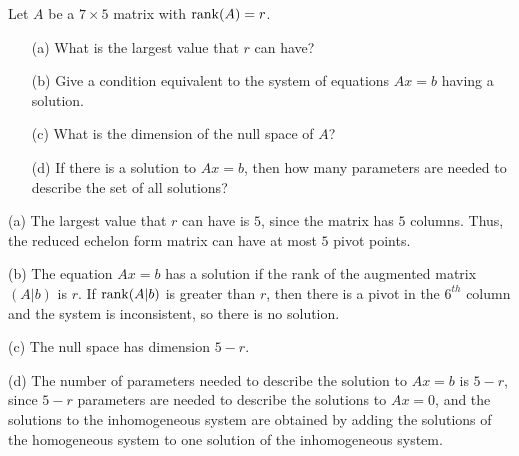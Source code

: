 \documentclass{ximera}
\begin{document}
\begin{exercise} \label{c5.6.1}
Let $A$ be a $7\times 5$ matrix with ${\rm rank}(A)=r$.
\begin{itemize}
\item[(a)]	What is the largest value that $r$ can have?
\item[(b)]	Give a condition equivalent to the system of
	equations $Ax=b$ having a solution.
\item[(c)]	What is the dimension of the null space of $A$?
\item[(d)]	If there is a solution to $Ax=b$, then how many
parameters are needed to describe the set of all solutions?
\end{itemize}

\begin{solution}

(a) The largest value that $r$ can have is $5$, since the matrix has
$5$ columns.  Thus, the reduced echelon form matrix can have at most
$5$ pivot points.

(b) The equation $Ax = b$ has a solution if the rank of the augmented
matrix $(A|b)$ is $r$.  If ${\rm rank} (A|b)$ is greater than $r$, then
there is a pivot in the $6^{th}$ column and the system is
inconsistent, so there is no solution.

(c) The null space has dimension $5 - r$.

(d) The number of parameters needed to describe the solution to
$Ax = b$ is $5 - r$, since $5 - r$ parameters are needed to describe
the solutions to $Ax = 0$, and the solutions to the inhomogeneous
system are obtained by adding the solutions of the homogeneous system
to one solution of the inhomogeneous system.


\end{solution}
\end{exercise}
\end{document}
